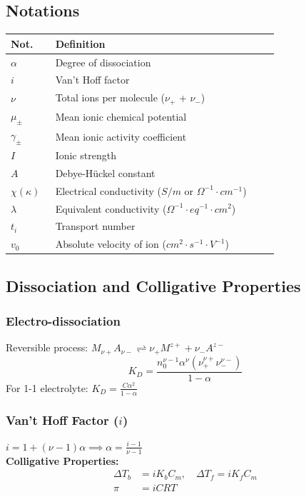 \subsection{Notations}
\begin{center}
\begin{tabular}{p{0.15\linewidth} p{0.75\linewidth}}
\toprule
\textbf{Not.} & \textbf{Definition} \\
\midrule
$\alpha$ & Degree of dissociation \\
$i$ & Van't Hoff factor \\
$\nu$ & Total ions per molecule ($\nu_+$ + $\nu_-$) \\
$\mu_{\pm}$ & Mean ionic chemical potential \\
$\gamma_{\pm}$ & Mean ionic activity coefficient \\
$I$ & Ionic strength \\
$A$ & Debye-Hückel constant \\
$\chi (\kappa)$ & Electrical conductivity ($S/m$ or $\Omega^{-1} \cdot cm^{-1}$) \\
$\lambda$ & Equivalent conductivity ($\Omega^{-1} \cdot eq^{-1} \cdot cm^2$) \\
$t_i$ & Transport number \\
$v_0$ & Absolute velocity of ion ($cm^2 \cdot s^{-1} \cdot V^{-1}$) \\
\bottomrule
\end{tabular}
\end{center}

\subsection{Dissociation and Colligative Properties}

\subsubsection{Electro-dissociation}
Reversible process: $M_{\nu+}A_{\nu-} \rightleftharpoons \nu_+ M^{z+} + \nu_- A^{z-}$
\begin{equation}
    K_D = \frac{n_0^{\nu-1} \alpha^\nu (\nu_+^{\nu+} \nu_-^{\nu-})}{1-\alpha}
\end{equation}
For 1-1 electrolyte: $K_D = \frac{C \alpha^2}{1-\alpha}$

\subsubsection{Van't Hoff Factor ($i$)}
$i = 1 + (\nu - 1)\alpha \implies \alpha = \frac{i-1}{\nu-1}$ \\
\textbf{Colligative Properties:}
\begin{align}
    \Delta T_b &= i K_b C_m, \quad \Delta T_f = i K_f C_m \\
    \pi &= i C RT
\end{align}

